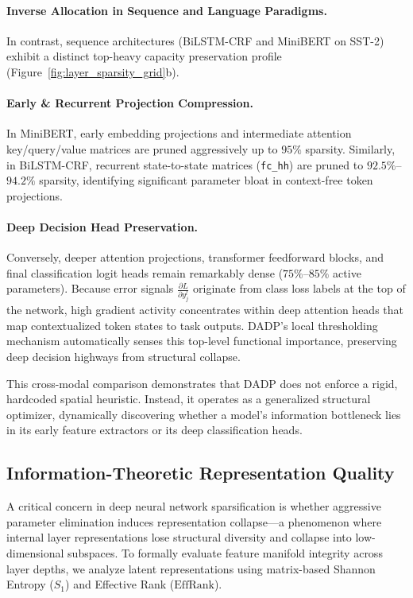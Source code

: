 \paragraph{Inverse Allocation in Sequence and Language Paradigms.}
In contrast, sequence architectures (BiLSTM-CRF and MiniBERT on SST-2) exhibit a distinct top-heavy capacity preservation profile (Figure~\ref{fig:layer_sparsity_grid}b).

\paragraph{Early \& Recurrent Projection Compression.} In MiniBERT, early embedding projections and intermediate attention key/query/value matrices are pruned aggressively up to $95\%$ sparsity. Similarly, in BiLSTM-CRF, recurrent state-to-state matrices (\texttt{fc\_hh}) are pruned to $92.5\%$--$94.2\%$ sparsity, identifying significant parameter bloat in context-free token projections.

\paragraph{Deep Decision Head Preservation.} Conversely, deeper attention projections, transformer feedforward blocks, and final classification logit heads remain remarkably dense ($75\%$--$85\%$ active parameters). Because error signals $\frac{\partial L}{\partial y_j^l}$ originate from class loss labels at the top of the network, high gradient activity concentrates within deep attention heads that map contextualized token states to task outputs. DADP's local thresholding mechanism automatically senses this top-level functional importance, preserving deep decision highways from structural collapse.

This cross-modal comparison demonstrates that DADP does not enforce a rigid, hardcoded spatial heuristic. Instead, it operates as a generalized structural optimizer, dynamically discovering whether a model's information bottleneck lies in its early feature extractors or its deep classification heads.


\subsection{Information-Theoretic Representation Quality}
\label{sec:information_quality}

A critical concern in deep neural network sparsification is whether aggressive parameter elimination induces representation collapse---a phenomenon where internal layer representations lose structural diversity and collapse into low-dimensional subspaces. To formally evaluate feature manifold integrity across layer depths, we analyze latent representations using matrix-based Shannon Entropy ($S_1$) and Effective Rank ($\text{EffRank}$).

